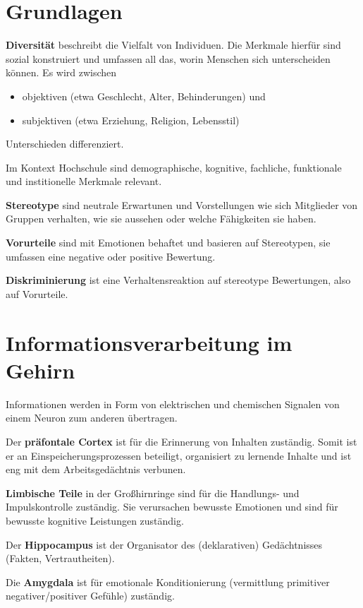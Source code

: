 \documentclass[twocolumn]{article}
\newcommand{\term}[1]{\textbf{#1}}
\begin{document}
\section{Grundlagen}

\term{Diversität} beschreibt die Vielfalt von Individuen. Die Merkmale hierfür sind sozial konstruiert und umfassen all das, worin Menschen sich unterscheiden können. Es wird zwischen 
\begin{itemize}
    \item objektiven (etwa Geschlecht, Alter, Behinderungen) und
    \item subjektiven (etwa Erziehung, Religion, Lebensstil)
\end{itemize} 
Unterschieden differenziert.

Im Kontext Hochschule sind demographische, kognitive, fachliche, funktionale und institionelle Merkmale relevant.

\term{Stereotype} sind neutrale Erwartunen und Vorstellungen wie sich Mitglieder von Gruppen verhalten, wie sie aussehen oder welche Fähigkeiten sie haben.

\term{Vorurteile} sind mit Emotionen behaftet und basieren auf Stereotypen, sie umfassen eine negative oder positive Bewertung.

\term{Diskriminierung} ist eine Verhaltensreaktion auf stereotype Bewertungen, also auf Vorurteile.

\section{Informationsverarbeitung im Gehirn}

Informationen werden in Form von elektrischen und chemischen Signalen von einem Neuron zum anderen übertragen.

Der \term{präfontale Cortex} ist für die Erinnerung von Inhalten zuständig. Somit ist er an Einspeicherungsprozessen beteiligt, organisiert zu lernende Inhalte und ist eng mit dem Arbeitsgedächtnis verbunen. 

\term{Limbische Teile} in der Großhirnringe sind für die Handlungs- und Impulskontrolle zuständig. Sie verursachen bewusste Emotionen und sind für bewusste kognitive Leistungen zuständig.

Der \term{Hippocampus} ist der Organisator des (deklarativen) Gedächtnisses (Fakten, Vertrautheiten).

Die \term{Amygdala} ist für emotionale Konditionierung (vermittlung primitiver negativer/positiver Gefühle) zuständig.
\end{document}
